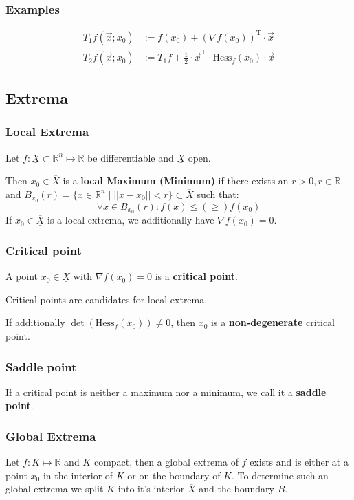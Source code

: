\documentclass[a4paper,fontsize = 10pt]{article}
\def\R{\mathbb{R}}
\def\X{\underline{\overline{X}}}
\begin{document}
\subsubsection*{Examples}
\begin{align*}
  T_1 f(\vec{x}; x_0) &:= f(x_0) + (\nabla f(x_0))^{\text{T}} \cdot \vec{x} \\
  T_2 f(\vec{x}; x_0) &:= T_1f + \frac{1}{2} \cdot \vec{x}^\top \cdot \text{Hess}_f(x_0) \cdot \vec{x}
\end{align*}


\subsection{Extrema}
\subsubsection*{Local Extrema}
Let \(f: \X \subset \R^n \mapsto \R\) be differentiable and \(\X\) open. 

Then \(x_0 \in \X\) is a \textbf{local Maximum (Minimum)} if there exists an $r > 0, r \in \R$ and \(B_{x_0}(r) = \{x\in \R^n \mid ||x-x_0|| < r \} \subset \X\) such that:
\[\forall x \in B_{x_0}(r): f(x) \le (\ge) f(x_0)\]
If \(x_0 \in \X\) is a local extrema, we additionally have \(\nabla f(x_0) = 0\).

\subsubsection*{Critical point}
A point \(x_0 \in \X\) with \(\nabla f(x_0) = 0\) is a \textbf{critical point}. 

Critical points are candidates for local extrema.

If additionally \(\det(\text{Hess}_f(x_0)) \ne 0\), then \(x_0\) is a \textbf{non-degenerate} critical point.

\subsubsection*{Saddle point}
If a critical point is neither a maximum nor a minimum, we call it a \textbf{saddle point}.

\subsubsection*{Global Extrema}
Let \(f: K \mapsto \R\) and \(K\) compact, then a global extrema of \(f\) exists and is either at a point $x_0$ in the interior of \(K\) or on the boundary of $K$. To determine such an global extrema we split \(K\) into it's interior \(\X\) and the boundary \(B\). 
\end{document}
